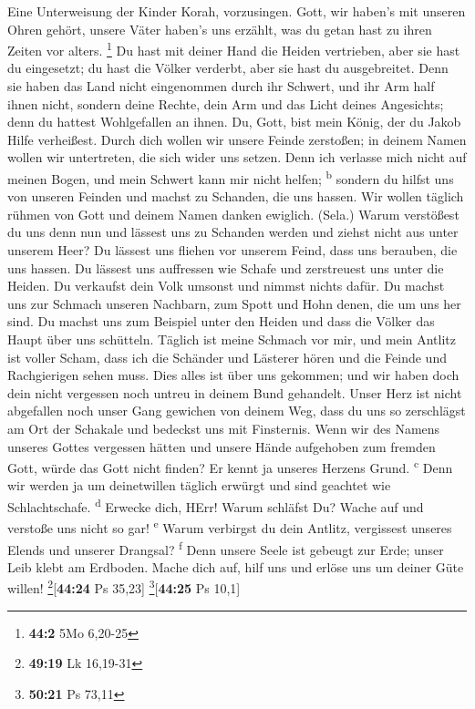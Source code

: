  Eine Unterweisung der Kinder Korah, vorzusingen.
 Gott, wir haben's mit unseren Ohren gehört, unsere Väter
haben's uns erzählt, was du getan hast zu ihren Zeiten vor alters.
\footnote{\textbf{44:2} 5Mo 6,20-25}  Du hast mit deiner
Hand die Heiden vertrieben, aber sie hast du eingesetzt; du hast die
Völker verderbt, aber sie hast du ausgebreitet.  Denn sie
haben das Land nicht eingenommen durch ihr Schwert, und ihr Arm half
ihnen nicht, sondern deine Rechte, dein Arm und das Licht deines
Angesichts; denn du hattest Wohlgefallen an ihnen.  Du,
Gott, bist mein König, der du Jakob Hilfe verheißest. 
Durch dich wollen wir unsere Feinde zerstoßen; in deinem Namen wollen
wir untertreten, die sich wider uns setzen.  Denn ich
verlasse mich nicht auf meinen Bogen, und mein Schwert kann mir nicht
helfen; \textsuperscript{b}  sondern du hilfst uns von
unseren Feinden und machst zu Schanden, die uns hassen. 
Wir wollen täglich rühmen von Gott und deinem Namen danken ewiglich.
(Sela.)  Warum verstößest du uns denn nun und lässest uns
zu Schanden werden und ziehst nicht aus unter unserem Heer?
 Du lässest uns fliehen vor unserem Feind, dass uns
berauben, die uns hassen.  Du lässest uns auffressen wie
Schafe und zerstreuest uns unter die Heiden.  Du
verkaufst dein Volk umsonst und nimmst nichts dafür.  Du
machst uns zur Schmach unseren Nachbarn, zum Spott und Hohn denen, die
um uns her sind.  Du machst uns zum Beispiel unter den
Heiden und dass die Völker das Haupt über uns schütteln. 
Täglich ist meine Schmach vor mir, und mein Antlitz ist voller Scham,
 dass ich die Schänder und Lästerer hören und die Feinde
und Rachgierigen sehen muss.  Dies alles ist über uns
gekommen; und wir haben doch dein nicht vergessen noch untreu in deinem
Bund gehandelt.  Unser Herz ist nicht abgefallen noch
unser Gang gewichen von deinem Weg,  dass du uns so
zerschlägst am Ort der Schakale und bedeckst uns mit Finsternis.
 Wenn wir des Namens unseres Gottes vergessen hätten und
unsere Hände aufgehoben zum fremden Gott,  würde das Gott
nicht finden? Er kennt ja unseres Herzens Grund. \textsuperscript{c}
 Denn wir werden ja um deinetwillen täglich erwürgt und
sind geachtet wie Schlachtschafe. \textsuperscript{d} 
Erwecke dich, HErr! Warum schläfst Du? Wache auf und verstoße uns nicht
so gar! \textsuperscript{e}  Warum verbirgst du dein
Antlitz, vergissest unseres Elends und unserer Drangsal?
\textsuperscript{f}  Denn unsere Seele ist gebeugt zur
Erde; unser Leib klebt am Erdboden.  Mache dich auf, hilf
uns und erlöse uns um deiner Güte willen! \footnote{\textbf{49:19} Lk
  16,19-31}{[}\textbf{44:24} Ps 35,23{]} \footnote{\textbf{50:21} Ps
  73,11}{[}\textbf{44:25} Ps 10,1{]}

